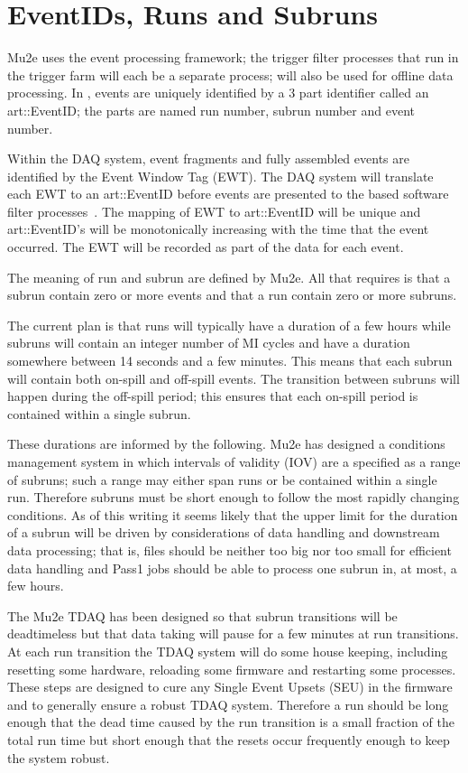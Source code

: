\section{EventIDs, Runs and Subruns}
\label{sec:TagsIDsRunsSubRuns}


Mu2e uses the \art event processing framework;
the trigger filter processes that run in the trigger farm will each be a separate \art process;
\art will also be used for offline data processing.
In \art, events are uniquely identified by a 3 part identifier called an
{\code art::EventID}; the parts are named run number, subrun number
and event number.

Within the DAQ system, event fragments and fully assembled events
are identified by the Event Window Tag (EWT).
The DAQ system will translate each EWT to an {\code art::EventID}
before events are presented to the \art based software filter processes~\cite{EventLabels}.
The mapping of EWT to  {\code art::EventID} will be unique and
{\code art::EventID}'s will be monotonically increasing with the time
that the event occurred.
The EWT will be recorded as part of the \art data for each event.

The meaning of run and subrun are defined by Mu2e.
All that \art requires is that a subrun contain zero or more
events and that a run contain zero or more subruns.

The current plan is that runs will typically have a duration of a few hours
while subruns will contain an integer number of MI cycles and
have a duration somewhere between 14 seconds and a few minutes.
This means that each subrun will contain both on-spill and
off-spill events.
The transition between subruns will happen during the off-spill period;
this ensures that each on-spill period is contained within a single subrun.

These durations are informed by the following.
Mu2e has designed a conditions management system
in which intervals of validity (IOV) are a specified as a range of subruns;
such a range may either span runs or be contained within a single run.
Therefore subruns must be short enough to follow the most
rapidly changing conditions.  As of this writing it seems
likely that the upper limit for the duration of a subrun will
be driven by considerations of data handling and downstream data processing;
that is, files should be neither too big nor too small for efficient data handling
and Pass1 jobs should be able to process one subrun in, at most, a few hours.

The Mu2e TDAQ has been designed so that subrun transitions will be deadtimeless
but that data taking will pause for a few minutes at run transitions.
At each run transition the TDAQ system will do some house keeping,
including resetting some hardware, reloading some firmware and restarting some processes.
These steps are designed to cure any Single Event Upsets (SEU) in the firmware
and to generally ensure a robust TDAQ system.
Therefore a run should be long enough that the dead time
caused by the run transition is a small fraction of the total run time
but short enough that the resets occur frequently enough
to keep the system robust.


